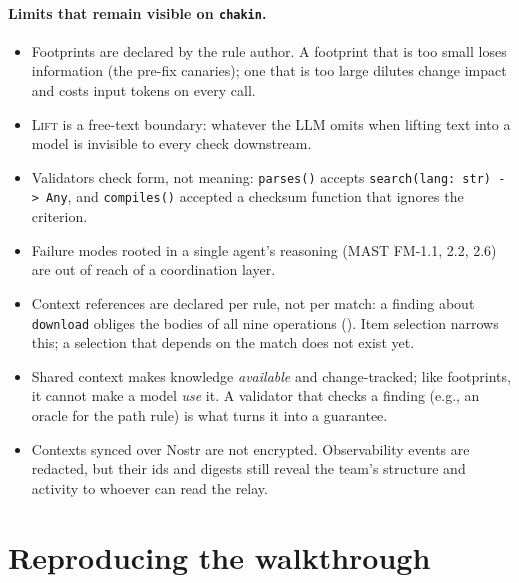 \documentclass[10pt,a4paper]{article}
\newcommand{\code}[1]{\texttt{#1}}
\theoremstyle{definition}
\begin{document}
\paragraph{Limits that remain visible on \texttt{chakin}.}
\begin{itemize}[nosep]
\item Footprints are declared by the rule author. A footprint that is too
small loses information (the pre-fix canaries); one that is too large dilutes
change impact and costs input tokens on every call.
\item \textsc{Lift} is a free-text boundary: whatever the LLM omits when
lifting text into a model is invisible to every check downstream.
\item Validators check form, not meaning: \code{parses()} accepts
\code{search(lang: str) -> Any}, and \code{compiles()} accepted a checksum
function that ignores the criterion.
\item Failure modes rooted in a single agent's reasoning (MAST FM-1.1, 2.2,
2.6) are out of reach of a coordination layer.
\item Context references are declared per rule, not per match: a finding
about \code{download} obliges the bodies of all nine operations
(). Item selection narrows this; a selection
that depends on the match does not exist yet.
\item Shared context makes knowledge \emph{available} and change-tracked; like
footprints, it cannot make a model \emph{use} it. A validator that checks a
finding (e.g., an oracle for the path rule) is what turns it into a
guarantee.
\item Contexts synced over Nostr are not encrypted. Observability events are
redacted, but their ids and digests still reveal the team's structure and
activity to whoever can read the relay.
\end{itemize}

\appendix
\section{Reproducing the walkthrough}\label{sec:repro}
\end{document}
